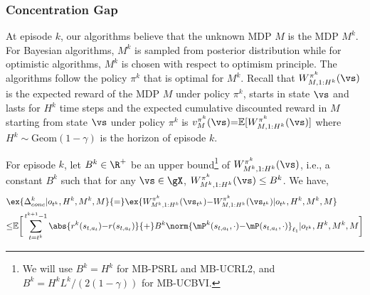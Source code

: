 \begin{subappendices}
\subsubsection{Concentration Gap}

At episode $k$, our algorithms believe that the unknown MDP $M$ is the MDP $M^k$.
For Bayesian algorithms, $M^k$ is sampled from posterior distribution while for optimistic algorithms, $M^k$ is chosen with respect to optimism principle.
The algorithms follow the policy $\pi^k$ that is optimal for $M^k$.
Recall that $W^{\pi^k}_{M,1:H^k}(\vs)$ is the expected reward of the MDP $M$ under policy $\pi^k$, starts in state $\vs$ and lasts for $H^k$ time steps and the expected cumulative discounted reward in $M$ starting from state $\vs$ under policy $\pi^k$ is $v_{M}^{\pi^k}(\vs){=}\mathbb{E}[W^{\pi^k}_{M, 1:H^k}(\vs)]$ where $H^k\sim \mathrm{Geom}(1-\gamma)$ is the horizon of episode $k$.

\begin{lem}
    \label{lem:regret_decomposition}
    For episode $k$, let $B^k\in\R^+$ be an upper bound\footnote{We will use $B^k=H^k$ for MB-PSRL and MB-UCRL2, and $B^k=H^kL^{k}/(2(1-\gamma))$ for MB-UCBVI.} of $W_{M^k,1:H^k}^{\pi^k}(\vs)$, i.e., a constant $B^k$ such that for any $\vs\in\gX$, $W_{M^k,1:H^k}^{\pi^k}(\vs)\le B^k$. We have,
    \begin{align}
        \label{eq:lem_decompo}
        &\ex{ \Delta^k_{conc} {\mid} o_{t^k}, H^k, M^k, M} {=} \ex{ W_{M^k,1:H^k}^{\pi^k}(\vs_{t^k}){-}W_{M,1:H^k}^{\pi^k}(\vs_{t^k}) {\mid} o_{t^k}, H^k, M^k, M}\nonumber \\
        &{\le}\mathbb{E}\bigg[\sum_{t=t^k}^{t^{k+1}-1}\abs{r^k(s_{t,a_t}){-}r(s_{t,a_t})}
        {+}B^k\norm{\mP^{k}(s_{t,a_t},\cdot){-}\mP(s_{t,a_t},\cdot)}_{\ell_1} {\mid} o_{t^k}, H^k, M^k, M\bigg]
    \end{align}
\end{lem}


\end{subappendices}
